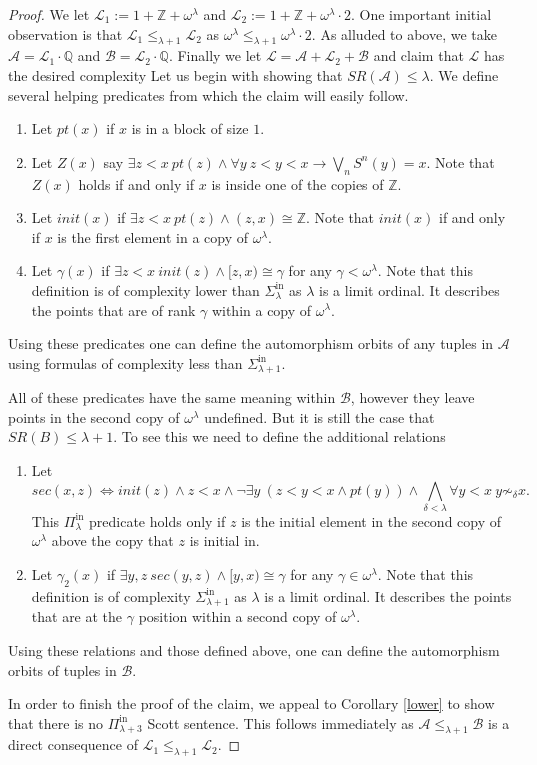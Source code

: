 \documentclass[10pt,a4paper]{amsart}
\providecommand{\A}{\mathcal{A}}
\providecommand{\L}{\mathcal{L}}
\providecommand{\B}{\mathcal{B}}
\providecommand{\Pinf}[1]{\Pi^{\mathrm{in}}_{#1}}
\providecommand{\Sinf}[1]{\Sigma^{\mathrm{in}}_{#1}}
\newcommand{\SR}{SR}
\newcommand{\Q}{\mathbb{Q}}
\newcommand{\Z}{\mathbb{Z}}
\renewcommand{\L}{\mathcal{L}}
\begin{document}
\begin{proof}
We let
$\L_1:=1+\Z+\omega^\lambda$ and $\L_2:=1+\Z+\omega^\lambda\cdot2$.
One important initial observation is that $\L_1\leq_{\lambda+1}\L_2$ as $\omega^\lambda\leq_{\lambda+1}\omega^\lambda\cdot2$.
As alluded to above, we take $\A=\L_1\cdot \Q$ and $\B=\L_2\cdot\Q$.
Finally we let $\L=\A+\L_2+\B$ and claim that $\L$ has the desired complexity
Let us begin with showing that $\SR(\A)\leq\lambda$. We define several helping predicates from which the claim will easily follow.
\begin{enumerate}
    \item Let $pt(x)$ if $x$ is in a block of size $1$. 
    \item Let $Z(x)$ say $\exists z<x ~pt(z)\land \forall y~z<y<x \to
        \bigvee_{n} S^n(y)=x.$ Note that $Z(x)$ holds if and only if $x$ is inside one of the copies of $\Z$.
    \item Let $init(x)$ if $\exists z<x ~ pt(z) \land (z,x)\cong\Z.$ Note that
        $init(x)$ if and only if $x$ is the first element in a copy of $\omega^\lambda$.
    \item Let $\gamma(x)$ if $\exists z<x ~init(z)\land [z,x)\cong\gamma$ for
        any $\gamma<\omega^\lambda$. Note that this definition is of complexity
        lower than $\Sinf\lambda$ as $\lambda$ is a limit ordinal. It describes
        the points that are of rank $\gamma$ within a copy of $\omega^{\lambda}$.
\end{enumerate}
Using these predicates one can define the automorphism orbits of any tuples in
$\A$ using formulas of complexity less than $\Sinf{\lambda+1}$.

All of these predicates have the same meaning within $\B$, however they leave
points in the second copy of $\omega^\lambda$ undefined. But it is still the case that $\SR(B)\leq\lambda+1$. To see this we need to define the additional relations
\begin{enumerate}
    \item Let 
        \[sec(x,z)\iff init(z) \land z<x \land \lnot\exists y~ \left(z<y<x\land
            pt(y)\right) \land \bigwedge_{\delta<\lambda}\forall y<x~ y\not\sim_\delta
        x.\]
        This $\Pinf\lambda$ predicate holds only if $z$ is the initial element in the second copy of $\omega^{\lambda}$ above the copy that $z$ is initial in.
    \item Let $\gamma_2(x)$ if $\exists y,z ~ sec(y,z) \land [y,x)\cong\gamma$ for any $\gamma\in\omega^\lambda$. Note that this definition is of complexity $\Sinf{\lambda+1}$ as $\lambda$ is a limit ordinal. It describes the points that are at the $\gamma$ position within a second copy of $\omega^{\lambda}$.
\end{enumerate}
Using these relations and those defined above, one can define the automorphism
orbits of tuples in $\B$.

In order to finish the proof of the claim, we appeal to Corollary \ref{lower} to
show that there is no $\Pinf{\lambda+3}$ Scott sentence.
This follows immediately as $\A\leq_{\lambda+1} \B$ is a direct consequence of $\L_1\leq_{\lambda+1}\L_2$.
\end{proof}
\end{document}
